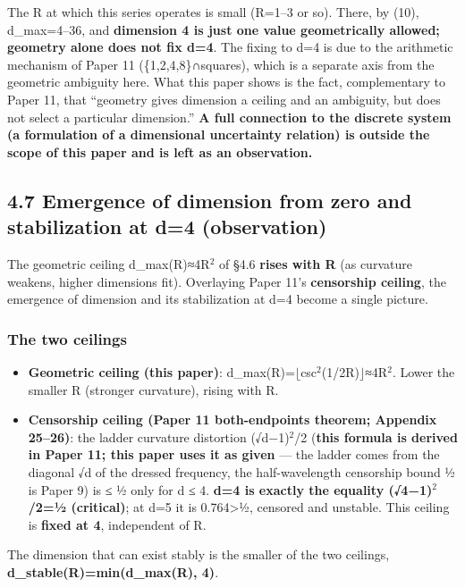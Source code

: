 \documentclass[
]{ltjsarticle}
\providecommand{\tightlist}{%
  \setlength{\itemsep}{0pt}\setlength{\parskip}{0pt}}
\begin{document}
The R at which this series operates is small (R=1--3 or so). There, by
(10), d\_max=4--36, and \textbf{dimension 4 is just one value
geometrically allowed; geometry alone does not fix d=4}. The fixing to
d=4 is due to the arithmetic mechanism of Paper 11
(\{1,2,4,8\}∩squares), which is a separate axis from the geometric
ambiguity here. What this paper shows is the fact, complementary to
Paper 11, that ``geometry gives dimension a ceiling and an ambiguity,
but does not select a particular dimension.'' \textbf{A full connection
to the discrete system (a formulation of a dimensional uncertainty
relation) is outside the scope of this paper and is left as an
observation.}

\subsection{4.7 Emergence of dimension from zero and stabilization at
d=4
(observation)}\label{emergence-of-dimension-from-zero-and-stabilization-at-d4-observation}

The geometric ceiling d\_max(R)≈4R\(^{2}\) of §4.6 \textbf{rises with R}
(as curvature weakens, higher dimensions fit). Overlaying Paper 11's
\textbf{censorship ceiling}, the emergence of dimension and its
stabilization at d=4 become a single picture.

\subsubsection{The two ceilings}\label{the-two-ceilings}

\begin{itemize}
\tightlist
\item
  \textbf{Geometric ceiling (this paper)}:
  d\_max(R)=\(\lfloor\)csc\(^{2}\)(1/2R)\(\rfloor\)≈4R\(^{2}\). Lower
  the smaller R (stronger curvature), rising with R.
\item
  \textbf{Censorship ceiling (Paper 11 both-endpoints theorem; Appendix
  25--26)}: the ladder curvature distortion (√d−1)\(^{2}\)/2
  (\textbf{this formula is derived in Paper 11; this paper uses it as
  given} --- the ladder comes from the diagonal √d of the dressed
  frequency, the half-wavelength censorship bound ½ is Paper 9) is ≤ ½
  only for d ≤ 4. \textbf{d=4 is exactly the equality (√4−1)\(^{2}\)/2=½
  (critical)}; at d=5 it is 0.764\textgreater½, censored and unstable.
  This ceiling is \textbf{fixed at 4}, independent of R.
\end{itemize}

The dimension that can exist stably is the smaller of the two ceilings,
\textbf{d\_stable(R)=min(d\_max(R), 4)}.
\end{document}
